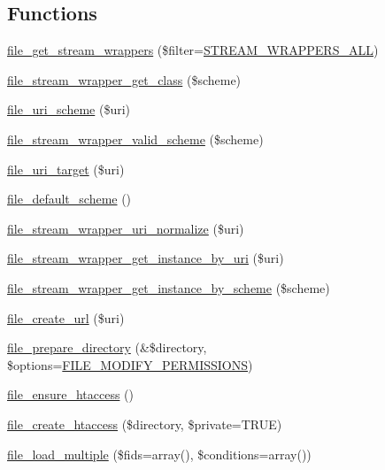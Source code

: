 \subsection*{Functions}
\begin{DoxyCompactItemize}
\item 
\hyperlink{group__file_ga0cd34cfd1bacb36b8ff82d01fb9a6f79}{file\_\-get\_\-stream\_\-wrappers} (\$filter=\hyperlink{stream__wrappers_8inc_aa396b3c5df01b437c006cf7ee9674f66}{STREAM\_\-WRAPPERS\_\-ALL})
\item 
\hyperlink{group__file_gaa31faf56baba0315a1867e2c1cc2b842}{file\_\-stream\_\-wrapper\_\-get\_\-class} (\$scheme)
\item 
\hyperlink{group__file_gaa98f967fe1033030e7e5262adda85463}{file\_\-uri\_\-scheme} (\$uri)
\item 
\hyperlink{group__file_ga12aebc3c6a9eb56d08511e7b968d0cef}{file\_\-stream\_\-wrapper\_\-valid\_\-scheme} (\$scheme)
\item 
\hyperlink{group__file_ga3137c530a505bcbaaeff3c4265f3f662}{file\_\-uri\_\-target} (\$uri)
\item 
\hyperlink{group__file_ga360bf8899ace3c977d257510651a763d}{file\_\-default\_\-scheme} ()
\item 
\hyperlink{group__file_gafd9a522999855ed89191e4e58bbbfeb3}{file\_\-stream\_\-wrapper\_\-uri\_\-normalize} (\$uri)
\item 
\hyperlink{group__file_ga2a693e908e5d4764c56f60b94070a635}{file\_\-stream\_\-wrapper\_\-get\_\-instance\_\-by\_\-uri} (\$uri)
\item 
\hyperlink{group__file_ga6b037293e4cfecbabbd8db32191778a5}{file\_\-stream\_\-wrapper\_\-get\_\-instance\_\-by\_\-scheme} (\$scheme)
\item 
\hyperlink{group__file_gaee57f47d60bda90961a2e19d580d4908}{file\_\-create\_\-url} (\$uri)
\item 
\hyperlink{group__file_ga738f89421a4f4c228676de817e5e485c}{file\_\-prepare\_\-directory} (\&\$directory, \$options=\hyperlink{group__file_ga30d56f1f9c1a4d832c411ef51d9b276d}{FILE\_\-MODIFY\_\-PERMISSIONS})
\item 
\hyperlink{group__file_gabb0ecbecf4cff451bd30a4bbc3e2d57f}{file\_\-ensure\_\-htaccess} ()
\item 
\hyperlink{group__file_gaf30766eaa4c080c8d61a9aa0cf89739b}{file\_\-create\_\-htaccess} (\$directory, \$private=TRUE)
\item 
\hyperlink{group__file_ga32afa29695b6da3f5d86cad18f063bfc}{file\_\-load\_\-multiple} (\$fids=array(), \$conditions=array())

\end{DoxyCompactItemize}
